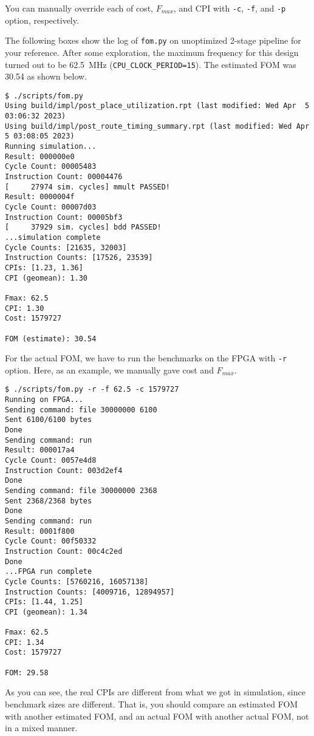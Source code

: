 You can manually override each of cost, $F_{max}$, and CPI with \verb|-c|, \verb|-f|, and \verb|-p| option, respectively.

The following boxes show the log of \verb|fom.py| on unoptimized 2-stage pipeline for your reference.
After some exploration, the maximum frequency for this design turned out to be 62.5~MHz (\verb|CPU_CLOCK_PERIOD=15|).
The estimated FOM was 30.54 as shown below.
\begin{verbatim}
$ ./scripts/fom.py
Using build/impl/post_place_utilization.rpt (last modified: Wed Apr  5 03:06:32 2023)
Using build/impl/post_route_timing_summary.rpt (last modified: Wed Apr  5 03:08:05 2023)
Running simulation...
Result: 000000e0
Cycle Count: 00005483
Instruction Count: 00004476
[     27974 sim. cycles] mmult PASSED!
Result: 0000004f
Cycle Count: 00007d03
Instruction Count: 00005bf3
[     37929 sim. cycles] bdd PASSED!
...simulation complete
Cycle Counts: [21635, 32003]
Instruction Counts: [17526, 23539]
CPIs: [1.23, 1.36]
CPI (geomean): 1.30

Fmax: 62.5
CPI: 1.30
Cost: 1579727

FOM (estimate): 30.54
\end{verbatim}

For the actual FOM, we have to run the benchmarks on the FPGA with \verb|-r| option.
Here, as an example, we manually gave cost and $F_{max}$.
\begin{verbatim}
$ ./scripts/fom.py -r -f 62.5 -c 1579727
Running on FPGA...
Sending command: file 30000000 6100
Sent 6100/6100 bytes
Done
Sending command: run
Result: 000017a4
Cycle Count: 0057e4d8
Instruction Count: 003d2ef4
Done
Sending command: file 30000000 2368
Sent 2368/2368 bytes
Done
Sending command: run
Result: 0001f800
Cycle Count: 00f50332
Instruction Count: 00c4c2ed
Done
...FPGA run complete
Cycle Counts: [5760216, 16057138]
Instruction Counts: [4009716, 12894957]
CPIs: [1.44, 1.25]
CPI (geomean): 1.34

Fmax: 62.5
CPI: 1.34
Cost: 1579727

FOM: 29.58
\end{verbatim}

As you can see, the real CPIs are different from what we got in simulation,
since benchmark sizes are different.
That is, you should compare an estimated FOM with another estimated FOM,
and an actual FOM with another actual FOM, not in a mixed manner.


\newpage
